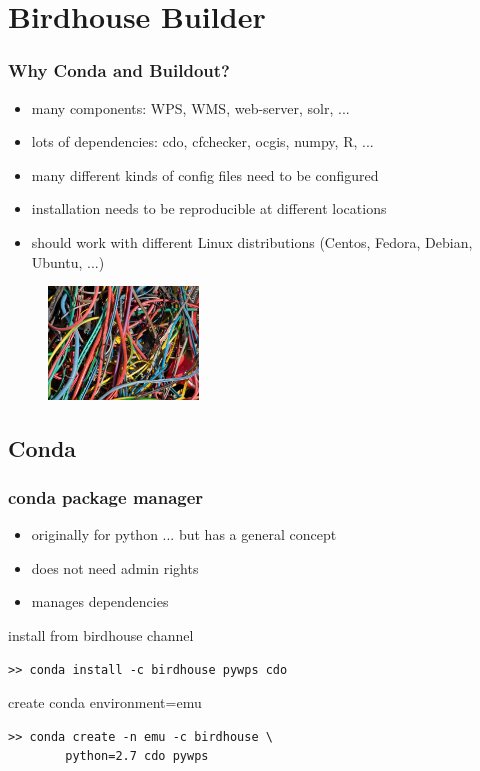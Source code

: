 \documentclass{beamer}
\begin{document}
  \section{Birdhouse Builder}


  \begin{frame}
    \frametitle{Why Conda and Buildout?}
    \begin{itemize}
      \item many components: WPS, WMS, web-server, solr, ...
      \item lots of dependencies: cdo, cfchecker, ocgis, numpy, R, ...
      \item many different kinds of config files need to be configured 
      \item installation needs to be reproducible at different locations
      \item should work with different Linux distributions (Centos, Fedora, Debian, Ubuntu, ...)
    \end{itemize}
    \begin{figure}
      \includegraphics[width=4cm]{images/chaos.png}
    \end{figure}
  \end{frame}


  \subsection{Conda}


  \begin{frame}[fragile]
    \frametitle{conda package manager}
    \begin{itemize}
      \item originally for python ... but has a general concept
      \item does not need admin rights
      \item manages dependencies
    \end{itemize}
    \begin{block}{install from birdhouse channel}
      \begin{verbatim}
>> conda install -c birdhouse pywps cdo 
      \end{verbatim}
    \end{block}
    \begin{block}{create conda environment=emu}
      \begin{verbatim}
>> conda create -n emu -c birdhouse \
        python=2.7 cdo pywps 
      \end{verbatim}
    \end{block}
\end{frame}
\end{document}
